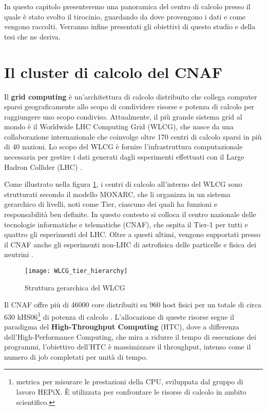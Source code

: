 In questo capitolo presenteremo una panoramica del centro di calcolo presso il
quale è stato svolto il tirocinio, guardando da dove provengono i dati e come
vengono raccolti. Verranno infine presentati gli obiettivi di questo studio e
della tesi che ne deriva.

\section{Il cluster di calcolo del CNAF}

Il \textbf{grid computing} è un'architettura di calcolo distribuito che
collega computer sparsi geograficamente allo scopo di condividere risorse e
potenza di calcolo per raggiungere uno scopo condiviso. Attualmente, il più
grande sistema grid al mondo è il Worldwide LHC Computing Grid (WLCG), che
nasce da una collaborazione internazionale che coinvolge oltre 170 centri di
calcolo sparsi in più di 40 nazioni. Lo scopo del WLCG è fornire
l'infrastruttura computazionale necessaria per gestire i dati generati dagli
esperimenti effettuati con il Large Hadron Collider (LHC) \cite{WLCG2023}.

Come illustrato nella figura \ref{fig:WLCG_tier_hierarchy}, i centri di
calcolo all'interno del WLCG sono strutturati secondo il modello MONARC, che
li organizza in un sistema gerarchico di livelli, noti come Tier, ciascuno dei
quali ha funzioni e responsabilità ben definite. In questo contesto si colloca
il centro nazionale delle tecnologie informatiche e telematiche (CNAF), che
ospita il Tier-1 per tutti e quattro gli esperimenti del LHC. Oltre a
questi ultimi, vengono supportati presso il CNAF anche gli esperimenti non-LHC
di astrofisica delle particelle e fisica dei neutrini \cite{Bortolotti2012}.

\begin{figure}[ht]
    \centering
    \texttt{[image: WLCG\_tier\_hierarchy]}
    \caption{Struttura gerarchica del WLCG \protect\cite{dalpra2019}}
    \label{fig:WLCG_tier_hierarchy}
\end{figure}

Il CNAF offre più di 46000 core distribuiti su 960 host fisici per un totale
di circa $630$ kHS06\footnote{metrica per misurare le prestazioni della CPU,
sviluppata dal gruppo di lavoro HEPiX. È utilizzata per confrontare le risorse
di calcolo in ambito scientifico.} di potenza di calcolo \cite{hepix2022}.
L'allocazione di queste risorse segue il paradigma del \textbf{High-Throughput
Computing} (HTC), dove a differenza dell'High-Performance Computing, che mira
a ridurre il tempo di esecuzione dei programmi, l'obiettivo dell'HTC è
massimizzare il throughput, intenso come il numero di job completati per unità
di tempo.

